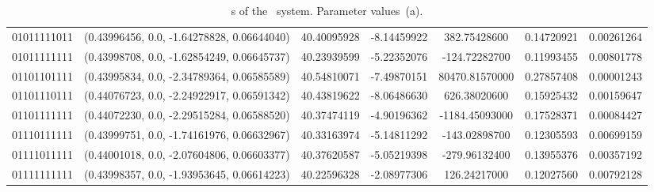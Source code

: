\begin{table}
\begin{tabular}{c|c|c|c|c|c|c}
 	01011111011 & (0.43996456,   0.0, -1.64278828, 0.06644040) & 40.40095928 & -8.14459922 & 382.75428600 &0.14720921 &0.00261264 \\ 
 	01011111111 & (0.43998708,   0.0, -1.62854249, 0.06645737) & 40.23939599 & -5.22352076 & -124.72282700 &0.11993455 &0.00801778 \\ 
 	01101101111 & (0.43995834,   0.0, -2.34789364, 0.06585589) & 40.54810071 & -7.49870151 & 80470.81570000 &0.27857408 &0.00001243 \\ 
 	01101110111 & (0.44076723,   0.0, -2.24922917, 0.06591342) & 40.43819622 & -8.06486630 & 626.38020600 &0.15925432 &0.00159647 \\ 
 	01101111111 & (0.44072230,   0.0, -2.29515284, 0.06588520) & 40.37474119 & -4.90196362 & -1184.45093000 &0.17528371 &0.00084427 \\ 
 	01110111111 & (0.43999751,   0.0, -1.74161976, 0.06632967) & 40.33163974 & -5.14811292 & -143.02898700 &0.12305593 &0.00699159 \\ 
 	01111011111 & (0.44001018,   0.0, -2.07604806, 0.06603377) & 40.37620587 & -5.05219398 & -279.96132400 &0.13955376 &0.00357192 \\ 
 	01111111111 & (0.43998357,   0.0, -1.93953645, 0.06614223) & 40.22596328 & -2.08977306 & 126.24217000 &0.12027560 &0.00792128 \\ 
 	\end{tabular}
	\caption{\rpo s of the \twoMode\ system. Parameter values \,(a).}
	\label{t-rpo2modeupto8}
\end{table}